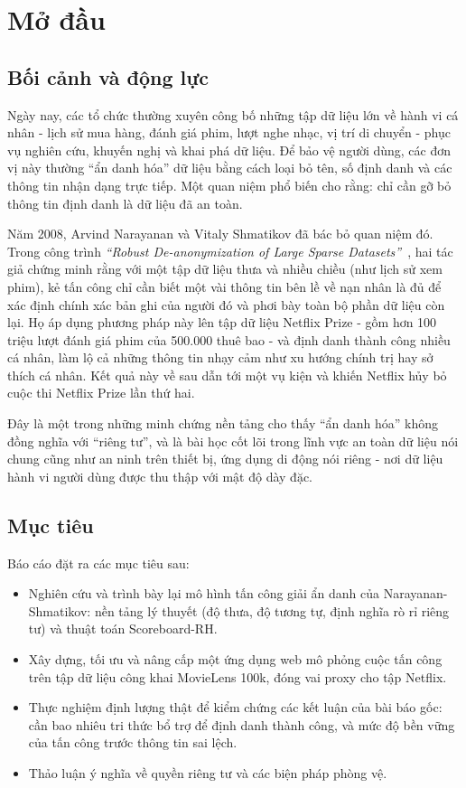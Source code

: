 \clearpage
{}
{}
\chapter*{Mở đầu}

\section*{Bối cảnh và động lực}
Ngày nay, các tổ chức thường xuyên công bố những tập dữ liệu lớn về hành vi cá nhân - lịch sử mua hàng, đánh giá phim, lượt nghe nhạc, vị trí di chuyển - phục vụ nghiên cứu, khuyến nghị và khai phá dữ liệu. Để bảo vệ người dùng, các đơn vị này thường ``ẩn danh hóa'' dữ liệu bằng cách loại bỏ tên, số định danh và các thông tin nhận dạng trực tiếp. Một quan niệm phổ biến cho rằng: chỉ cần gỡ bỏ thông tin định danh là dữ liệu đã an toàn.

Năm 2008, Arvind Narayanan và Vitaly Shmatikov đã bác bỏ quan niệm đó. Trong công trình \textit{``Robust De-anonymization of Large Sparse Datasets''}~\cite{narayanan}, hai tác giả chứng minh rằng với một tập dữ liệu thưa và nhiều chiều (như lịch sử xem phim), kẻ tấn công chỉ cần biết một vài thông tin bên lề về nạn nhân là đủ để xác định chính xác bản ghi của người đó và phơi bày toàn bộ phần dữ liệu còn lại. Họ áp dụng phương pháp này lên tập dữ liệu Netflix Prize - gồm hơn 100 triệu lượt đánh giá phim của 500.000 thuê bao - và định danh thành công nhiều cá nhân, làm lộ cả những thông tin nhạy cảm như xu hướng chính trị hay sở thích cá nhân. Kết quả này về sau dẫn tới một vụ kiện và khiến Netflix hủy bỏ cuộc thi Netflix Prize lần thứ hai.

Đây là một trong những minh chứng nền tảng cho thấy ``ẩn danh hóa'' không đồng nghĩa với ``riêng tư'', và là bài học cốt lõi trong lĩnh vực an toàn dữ liệu nói chung cũng như an ninh trên thiết bị, ứng dụng di động nói riêng - nơi dữ liệu hành vi người dùng được thu thập với mật độ dày đặc.

\section*{Mục tiêu}
Báo cáo đặt ra các mục tiêu sau:
\renewcommand{\labelitemi}{$-$}
\begin{itemize}
	\item Nghiên cứu và trình bày lại mô hình tấn công giải ẩn danh của Narayanan-Shmatikov: nền tảng lý thuyết (độ thưa, độ tương tự, định nghĩa rò rỉ riêng tư) và thuật toán Scoreboard-RH.
	\item Xây dựng, tối ưu và nâng cấp một ứng dụng web mô phỏng cuộc tấn công trên tập dữ liệu công khai MovieLens 100k, đóng vai proxy cho tập Netflix.
	\item Thực nghiệm định lượng thật để kiểm chứng các kết luận của bài báo gốc: cần bao nhiêu tri thức bổ trợ để định danh thành công, và mức độ bền vững của tấn công trước thông tin sai lệch.
	\item Thảo luận ý nghĩa về quyền riêng tư và các biện pháp phòng vệ.
\end{itemize}

